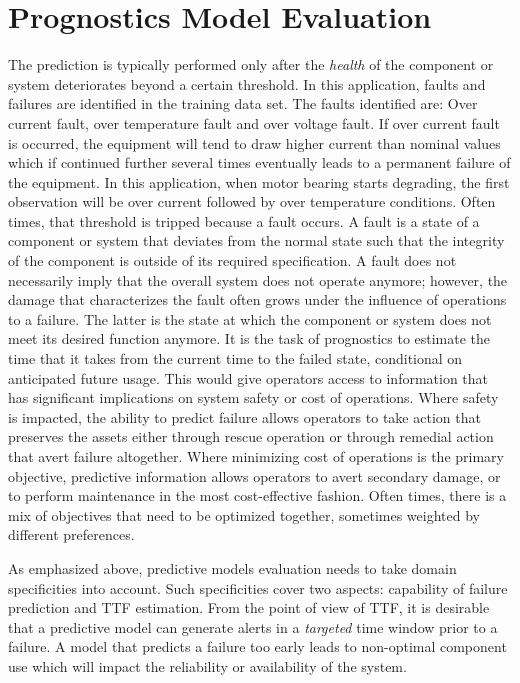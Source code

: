 \documentclass[sigconf]{acmart}
\begin{document}
\section{Prognostics Model Evaluation}
\cite{Saxena2009} The prediction is typically performed only after the \textit{health} of the component or system deteriorates beyond a certain threshold. In this application, faults and failures are identified in the training data set. The faults identified are: Over current fault, over temperature fault and over voltage fault. If over current fault is occurred, the equipment will tend to draw higher current than nominal values which if continued further several times eventually leads to a permanent failure of the equipment. In this application, when motor bearing starts degrading, the first observation will be over current followed by over temperature conditions.
Often times, that threshold is tripped because a fault occurs. A fault is a state of a component or system that deviates from the normal state such that the integrity of the component is outside of its required specification. A fault does not necessarily imply that the overall system does not operate anymore; however, the damage that characterizes the fault often grows under the influence of operations to a failure. The latter is the state at which the component or system does not meet its desired function anymore. It is the task of prognostics to estimate the time that it takes from the current time to the failed state, conditional on anticipated future usage. This would give operators access to information that has significant implications on system safety or cost of operations. Where safety is impacted, the ability to predict failure allows operators to take action that preserves the assets either through rescue operation or through remedial action that avert failure altogether. Where minimizing cost of operations is the primary objective, predictive information allows operators to avert secondary damage, or to perform maintenance in the most cost-effective fashion. Often times, there is a mix of objectives that need to be optimized together, sometimes weighted by different preferences.

As emphasized above, predictive models evaluation needs to take domain specificities into account. Such specificities cover two aspects: capability of failure prediction and TTF estimation. From the point of view of TTF, it is desirable that a predictive model can generate alerts in a \textit{targeted} time window prior to a failure. A model that predicts a failure too early leads to non-optimal component use \cite{Yang2014} which will impact the reliability or availability of the system.
\end{document}

